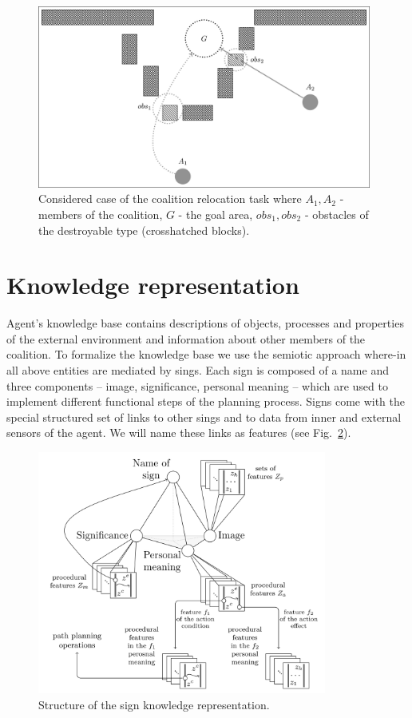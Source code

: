\documentclass[runningheads,a4paper]{llncs}
\begin{document}
\begin{figure}
	\centering
	\includegraphics[height=6cm]{rita_example}
	\caption{Considered case of the coalition relocation task where $A_1, A_2$ - members of the coalition, $G$ - the goal area, $obs_1,obs_2$ - obstacles of the destroyable type (crosshatched blocks).}
	\label{fig:case}
\end{figure}

\section{Knowledge representation}\label{knowledge}

Agent's knowledge base contains descriptions of objects, processes and properties of the external environment and information about other members of the coalition. To formalize the knowledge base we use the semiotic approach where-in all above entities are mediated by sings.  Each sign is composed of a name and three components – image, significance, personal meaning – which are used to implement different functional steps of the planning process. Signs come with the special structured set of links to other sings and to data from inner and external sensors of the agent. We will name these links as features (see Fig.~\ref{fig:sign}).

\begin{figure}
	\centering
	\includegraphics[height=8cm]{sign_kr}
	\caption{Structure of the sign knowledge representation.}
	\label{fig:sign}
\end{figure}
\end{document}
